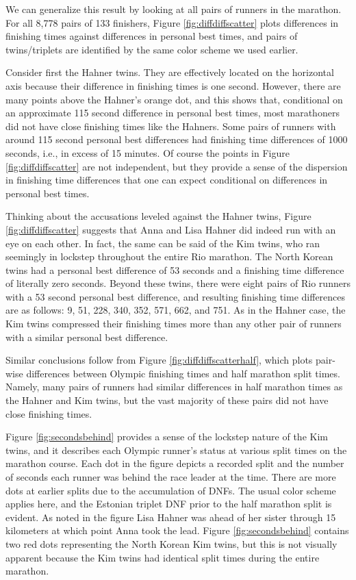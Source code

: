 \documentclass[12pt,titlepage]{article}
\begin{document}
We can generalize this result by looking at all pairs of runners in
the marathon.  For all 8,778 pairs of 133 finishers, Figure
\ref{fig:diffdiffscatter} plots differences in finishing times against
differences in personal best times, and pairs of twins/triplets are
identified by the same color scheme we used earlier.

Consider first the Hahner twins.  They are effectively located on the
horizontal axis because their difference in finishing times is one
second.  However, there are many points above the Hahner's orange dot,
and this shows that, conditional on an approximate 115 second
difference in personal best times, most marathoners did not have close
finishing times like the Hahners.  Some pairs of runners with around
115 second personal best differences had finishing time differences of
1000 seconds, i.e., in excess of 15 minutes.  Of course the points in
Figure \ref{fig:diffdiffscatter} are not independent, but they provide
a sense of the dispersion in finishing time differences that one can
expect conditional on differences in personal best times.

Thinking about the accusations leveled against the Hahner twins,
Figure \ref{fig:diffdiffscatter} suggests that Anna and Lisa Hahner
did indeed run with an eye on each other.  In fact, the same can be
said of the Kim twins, who ran seemingly in lockstep throughout the
entire Rio marathon.  The North Korean twins had a personal best
difference of 53 seconds and a finishing time difference of literally
zero seconds.  Beyond these twins, there were eight pairs of Rio
runners with a 53 second personal best difference, and resulting
finishing time differences are as follows: 9, 51, 228, 340, 352, 571,
662, and 751.  As in the Hahner case, the Kim twins compressed their
finishing times more than any other pair of runners with a similar
personal best difference.

Similar conclusions follow from Figure \ref{fig:diffdiffscatterhalf},
which plots pair-wise differences between Olympic finishing times and
half marathon split times.  Namely, many pairs of runners had similar
differences in half marathon times as the Hahner and Kim twins, but
the vast majority of these pairs did not have close finishing times.

Figure \ref{fig:secondsbehind} provides a sense of the lockstep nature
of the Kim twins, and it describes each Olympic runner's status at
various split times on the marathon course.  Each dot in the figure
depicts a recorded split and the number of seconds each runner was
behind the race leader at the time.  There are more dots at earlier
splits due to the accumulation of DNFs.  The usual color scheme
applies here, and the Estonian triplet DNF prior to the half marathon
split is evident. As noted in the figure Lisa Hahner was ahead of her
sister through 15 kilometers at which point Anna took the lead.
Figure \ref{fig:secondsbehind} contains two red dots representing the
North Korean Kim twins, but this is not visually apparent because the
Kim twins had identical split times during the entire marathon.
\end{document}

